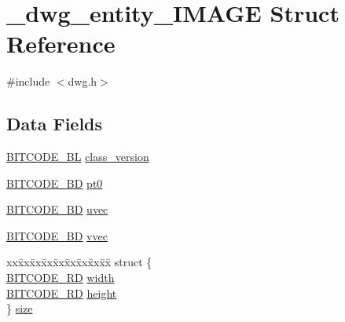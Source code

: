 \hypertarget{struct__dwg__entity__IMAGE}{\section{\-\_\-dwg\-\_\-entity\-\_\-\-I\-M\-A\-G\-E \-Struct \-Reference}
\label{struct__dwg__entity__IMAGE}
}


{\ttfamily \#include $<$dwg.\-h$>$}

\subsection*{\-Data \-Fields}
\begin{DoxyCompactItemize}
\item 
\hyperlink{dwg_8h_aebd5f127038868cbabc3d55d91da776c}{\-B\-I\-T\-C\-O\-D\-E\-\_\-\-B\-L} \hyperlink{struct__dwg__entity__IMAGE_a780a6ae7b47e8e745599797279c53719}{class\-\_\-version}
\item 
\hyperlink{dwg_8h_a00698ef1bb072aa0a9360c6fc1c57587}{\-B\-I\-T\-C\-O\-D\-E\-\_\-B\-D} \hyperlink{struct__dwg__entity__IMAGE_a8b594986af358fb09f6114dba8eea4de}{pt0}
\item 
\hyperlink{dwg_8h_a00698ef1bb072aa0a9360c6fc1c57587}{\-B\-I\-T\-C\-O\-D\-E\-\_\-B\-D} \hyperlink{struct__dwg__entity__IMAGE_ab37550b0d4eb6c4e1899fd327a4c7917}{uvec}
\item 
\hyperlink{dwg_8h_a00698ef1bb072aa0a9360c6fc1c57587}{\-B\-I\-T\-C\-O\-D\-E\-\_\-B\-D} \hyperlink{struct__dwg__entity__IMAGE_a4cdf679c7f260a8799bbb15a80fde48f}{vvec}
\item 
\begin{tabbing}
xx\=xx\=xx\=xx\=xx\=xx\=xx\=xx\=xx\=\kill
struct \{\\
\>\hyperlink{dwg_8h_a309e7e59a4030a89943640d0d327cef7}{BITCODE\_RD} \hyperlink{struct__dwg__entity__IMAGE_a0763c6bfe34e8fb7946b4811ba1230c8}{width}\\
\>\hyperlink{dwg_8h_a309e7e59a4030a89943640d0d327cef7}{BITCODE\_RD} \hyperlink{struct__dwg__entity__IMAGE_a851324c515b2b9243503731629b29d65}{height}\\
\} \hyperlink{struct__dwg__entity__IMAGE_a235183119c3e68e6d899666731b32b1f}{size}\\


\end{tabbing}
\end{DoxyCompactItemize}
